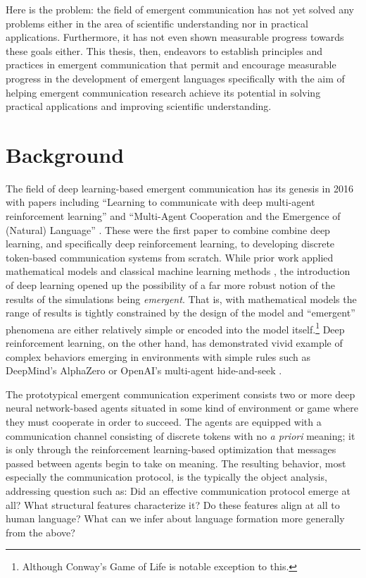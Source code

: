 Here is the problem: the field of emergent communication has not yet solved any problems either in the area of scientific understanding nor in practical applications.
Furthermore, it has not even shown measurable progress towards these goals either.
This thesis, then, endeavors to establish principles and practices in emergent communication that permit and encourage measurable progress in the development of emergent languages specifically with the aim of helping emergent communication research achieve its potential in solving practical applications and improving scientific understanding.

\section{Background}

The field of deep learning-based emergent communication has its genesis in 2016 with papers including
  ``Learning to communicate with deep multi-agent reinforcement learning'' \citep{foerster2016learning}
  and ``Multi-Agent Cooperation and the Emergence of (Natural) Language'' \citep{lazaridou2016multiagent}.
These were the first paper to combine combine deep learning, and specifically deep reinforcement learning, to developing discrete token-based communication systems from scratch.
While prior work applied mathematical models \citep{brighton2005} and classical machine learning methods \citep{werner_Dyer_1991}, the introduction of deep learning opened up the possibility of a far more robust notion of the results of the simulations being \emph{emergent}.
That is, with mathematical models the range of results is tightly constrained by the design of the model and ``emergent'' phenomena are either relatively simple or encoded into the model itself.\footnote{Although Conway's Game of Life is notable exception to this.}
Deep reinforcement learning, on the other hand, has demonstrated vivid example of complex behaviors emerging in environments with simple rules such as DeepMind's AlphaZero \citep{silver2017masteringchessshogiselfplay} or OpenAI's multi-agent hide-and-seek \citep{baker2020emergenttoolusemultiagent}.

The prototypical emergent communication experiment consists two or more deep neural network-based agents situated in some kind of environment or game where they must cooperate in order to succeed.
The agents are equipped with a communication channel consisting of discrete tokens with no \emph{a priori} meaning; it is only through the reinforcement learning-based optimization that messages passed between agents begin to take on meaning.
The resulting behavior, most especially the communication protocol, is the typically the object analysis, addressing question such as:
  Did an effective communication protocol emerge at all?
  What structural features characterize it?
  Do these features align at all to human language?
  What can we infer about language formation more generally from the above?

